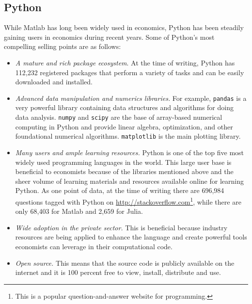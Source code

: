 \subsection{Python}

While Matlab has long been widely used in economics, Python has been steadily
gaining users in economics during recent years. Some of Python's most
compelling selling points are as follows:

\begin{itemize}

  \item \textit{A mature and rich package ecosystem}. At the time of writing,
  Python has 112,232 registered packages that perform a variety of tasks and can
  be easily downloaded and installed.

  \item \textit{Advanced data manipulation and numerics libraries.} For example,
  \texttt{pandas} is a very powerful library containing data structures and
  algorithms for doing data analysis. \texttt{numpy} and \texttt{scipy} are the
  base of array-based numerical computing in Python and provide linear algebra,
  optimization, and other foundational numerical algorithms. \texttt{matplotlib}
  is the main plotting library.

  \item \textit{Many users and ample learning resources.} Python is one of the
  top five most widely used programming languages in the world. This large user
  base is beneficial to economists because of the libraries mentioned above and
  the sheer volume of learning materials and resources available online for
  learning Python. As one point of data, at the time of writing there are
  696,984 questions tagged with Python on
  \url{http://stackoverflow.com}\footnote{ This is a popular question-and-answer website for programming.}, while there are only 68,403 for Matlab and
  2,659 for Julia.

  \item \textit{Wide adoption in the private sector.} This is beneficial
  because industry resources are being applied to enhance the language and
  create powerful tools economists can leverage in their computational code.

  \item \textit{Open source.} This means that the source code is publicly
  available on the internet and it is 100 percent free to view, install,
  distribute and use.

\end{itemize}

